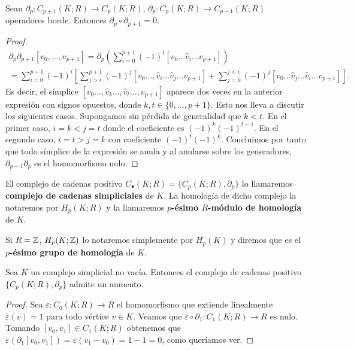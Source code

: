 \begin{lema}
	Sean \(\partial_{p} : C_{p+1}(K;R) \to C_{p}(K;R)\),
	\(\partial_{p}: C_{p}(K;R) \to C_{p-1}(K;R)\) operadores borde. Entonces \(\partial
	_{p}\circ \partial_{p+1}= 0\).
\end{lema}
\begin{proof}
	\begin{gather*}
		\partial_{p}\partial_{p+1}[v_{0}, \ldots, v_{p+1}] = \partial_{p}\left( \sum_{i=0}
		^{p+1}(-1)^{i}[v_{0} \ldots \hat{v}_{i} \ldots v_{p+1}] \right) \\ = \sum_{i=0}
		^{p+1}(-1)^{i} \left[ \sum_{j>i}^{p+1}(-1)^{j}[v_{0} \ldots, \hat{v}_{i} \ldots
		\hat{v}_{j} \ldots v_{p+1}] + \sum_{j=0}^{j<i}(-1)^{j}[v_{0} \ldots \hat{v}_{j}
		\ldots \hat{v}_{i} \ldots v_{p+1}] \right].
	\end{gather*}
	Es decir, el símplice
	\([v_{0}\ldots,\hat{v}_{k}\ldots,\hat{v}_{t} \ldots, v_{p+1}]\) aparece dos veces
	en la anterior expresión con signos opuestos, donde \(k,t \in \{0, \ldots, p+1\}\).
	Esto nos lleva a discutir los siguientes casos. Supongamos sin pérdida de generalidad
	que \(k < t\). En el primer caso, \(i = k < j = t\) donde el coeficiente es \((-1)^{k}
	(-1)^{t-1}\). En el segundo caso, \(i = t > j = k\) con coeficiente \((-1)^{t}(-1)^{k}\).
	Concluimos por tanto que todo símplice de la expresión se anula y al anularse
	sobre los generadores, \(\partial_{p-1}\partial_{p}\) es el homomorfismo nulo.
\end{proof}

\begin{definicion}
	El complejo de cadenas positivo \(C_{\bullet}(K;R) = \{C_{p}(K;R), \partial_{p}\}\)
	lo llamaremos \textbf{complejo de cadenas simpliciales} de \(K\). La homología de
	dicho complejo la notaremos por \(H_{p}(K;R)\) y la llamaremos \textbf{\(p\)-ésimo
	\(R\)-módulo de homología} de \(K\).
\end{definicion}
Si \(R=\mathbb{Z}\), \(H_{p}(K;\mathbb{Z})\) lo notaremos simplemente por \(H_{p}(K)\) y diremos que
es el \textbf{\(p\)-ésimo grupo de homología} de \(K\).

\begin{proposicion}
	\label{prop:aumento} Sea \(K\) un complejo simplicial no vacío. Entonces el
	complejo de cadenas positivo \(\{ C_{p}(K;R), \partial_{p} \}\) admite un
	aumento.
\end{proposicion}
\begin{proof}
	Sea \(\varepsilon: C_{0}(K;R) \to R\) el homomorfismo que extiende linealmente \(\varepsilon
	(v) = 1\) para todo vértice \(v \in K\). Veamos que
	\(\varepsilon \circ \partial_{1} : C_{1}(K;R) \to R\) es nulo. Tomando \([v_{0},v_{1}
	] \in C_{1}(K;R)\) obtenemos que \(\varepsilon (\partial_{1}[v_{0},v_{1}]) = \varepsilon
	(v_{1} - v_{0}) = 1-1 = 0\), como queríamos ver.
\end{proof}


